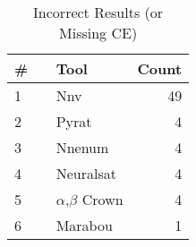 
\begin{table}[h]
\begin{center}
\caption{Incorrect Results (or Missing CE)} \label{tab:stats4}
{\setlength{\tabcolsep}{2pt}
\begin{tabular}[h]{@{}llr@{}}
\toprule
\textbf{\# ~} & \textbf{Tool} & \textbf{Count}\\
\midrule
1 & Nnv & 49 \\
2 & Pyrat & 4 \\
3 & Nnenum & 4 \\
4 & Neuralsat & 4 \\
5 & $\alpha$,$\beta$ Crown & 4 \\
6 & Marabou & 1 \\
\bottomrule
\end{tabular}
}
\end{center}
\end{table}


